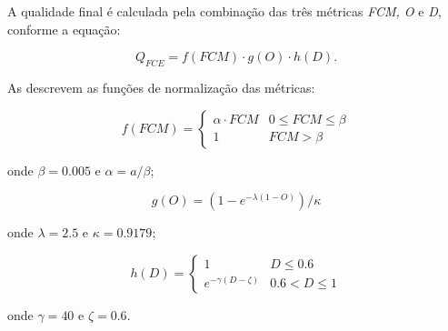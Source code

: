 \par A qualidade final é calculada pela combinação das três métricas \textit{FCM, O} e \textit{D}, conforme a equação:

\begin{equation} \label{eq:fce:Q}
    Q_{FCE} = f(FCM) \cdot g(O) \cdot h(D).
\end{equation}

As  descrevem as funções de normalização das métricas:

\begin{equation}\label{eq:fce:normFCM}
  f(FCM) =
  \begin{cases}
    \alpha \cdot FCM & 0 \leq FCM \leq \beta\\
    1  &  FCM > \beta
  \end{cases}
\end{equation}

\noindent onde $\beta = 0.005$ e $\alpha = a/\beta$;


\begin{equation}\label{eq:fce:normO}
  g(O) = (1 - e^{-\lambda(1 - O)})/\kappa
\end{equation}

\noindent onde $\lambda = 2.5$ e $\kappa = 0.9179$;

\begin{equation}\label{eq:fce:normD}
  h(D) =
  \begin{cases}
    1 & D \leq 0.6\\
    e^{-\gamma(D - \zeta)}  &  0.6 < D \leq 1
  \end{cases}
\end{equation}

\noindent onde $\gamma = 40$ e $\zeta = 0.6$.